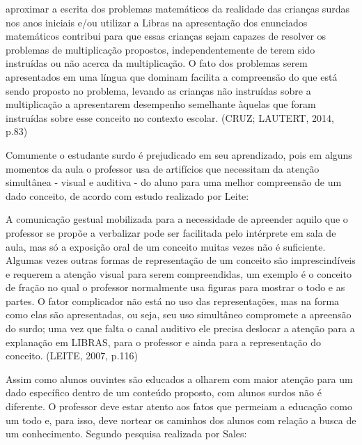 \documentclass[brasil]{abnt}
\begin{document}
			\begin{citacao} [...] aproximar a escrita dos problemas matemáticos da realidade das crianças surdas nos anos iniciais e/ou utilizar a Libras na apresentação dos enunciados matemáticos contribui para que
							essas crianças sejam capazes de resolver os problemas de multiplicação propostos, independentemente de terem sido instruídas ou não acerca da multiplicação. O fato
							dos problemas serem apresentados em uma língua que dominam facilita a compreensão do que está sendo proposto no problema, levando as crianças não instruídas sobre a multiplicação a apresentarem 
							desempenho semelhante àquelas que foram instruídas sobre esse conceito no contexto escolar. (CRUZ; LAUTERT, 2014, p.83)
			\end{citacao}

	Comumente o estudante surdo é prejudicado em seu aprendizado, pois em alguns momentos da aula o professor usa de artifícios que necessitam da atenção simultânea - visual e auditiva - do aluno para uma melhor 
	compreensão de um dado conceito, de acordo com estudo realizado por Leite: 

			\begin{citacao}A comunicação gestual mobilizada para a necessidade de apreender aquilo que o professor se propõe a verbalizar pode ser facilitada pelo intérprete em sala de aula, mas só a exposição oral de um 
							conceito muitas vezes não é suficiente. Algumas vezes outras formas  de  representação  de  um  conceito  são  imprescindíveis  e  requerem  a  atenção visual  para  serem  compreendidas,  um  
							exemplo  é  o  conceito  de  fração  no  qual  o professor normalmente usa figuras para mostrar o todo e as partes. O fator complicador não está no uso das representações, mas na forma como 
							elas são apresentadas, ou seja, seu  uso  simultâneo  compromete  a  apreensão  do  surdo; uma  vez  que  falta  o  canal auditivo ele precisa deslocar a atenção para a explanação em LIBRAS, 
							para o professor e ainda para a representação do conceito. (LEITE, 2007, p.116) 
			\end{citacao}
	
	Assim como alunos ouvintes são educados a olharem com maior atenção para um dado específico dentro de um conteúdo proposto, com alunos surdos não é diferente. O professor deve estar atento aos fatos que permeiam a educação como um todo e, para isso, 
	deve nortear os caminhos dos alunos com relação a busca de um conhecimento. Segundo pesquisa realizada por Sales:
	
\end{document}
